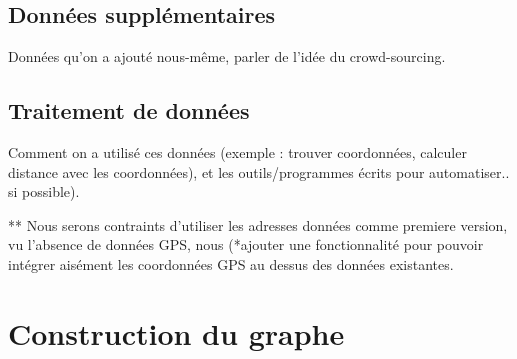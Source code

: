 \subsection{Données supplémentaires}
Données qu'on a ajouté nous-même, parler de l'idée du crowd-sourcing.

\subsection{Traitement de données}
Comment on a utilisé ces données (exemple : trouver coordonnées, calculer distance avec les coordonnées), et les outils/programmes écrits pour automatiser.. si possible).
	
** Nous serons contraints d'utiliser les adresses données comme premiere version, vu l'absence de données GPS, nous (*ajouter une fonctionnalité pour pouvoir intégrer aisément les coordonnées GPS au dessus des données existantes.

\section{Construction du graphe}
